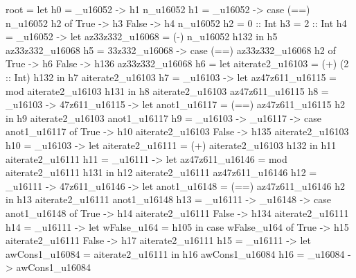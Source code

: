 root = let
         h0 = \n_u16052 -> h1 n_u16052
         h1 = \n_u16052 -> case (==) n_u16052 h2 of
                             True -> h3
                             False -> h4 n_u16052
         h2 = 0 :: Int
         h3 = 2 :: Int
         h4 = \n_u16052 -> let az33z332_u16068 = (-) n_u16052 h132
                           in h5 az33z332_u16068
         h5 = \az33z332_u16068 -> case (==) az33z332_u16068 h2 of
                                    True -> h6
                                    False -> h136 az33z332_u16068
         h6 = let aiterate2_u16103 = (+) (2 :: Int) h132
              in h7 aiterate2_u16103
         h7 = _u16103 -> let
                                     az47z611_u16115 = mod aiterate2_u16103 h131
                                   in h8 aiterate2_u16103 az47z611_u16115
         h8 = _u16103 -> \az47z611_u16115 -> let
                                                         anot1_u16117 = (==) az47z611_u16115 h2
                                                       in h9 aiterate2_u16103 anot1_u16117
         h9 = _u16103 -> _u16117 -> case anot1_u16117 of
                                                      True -> h10 aiterate2_u16103
                                                      False -> h135 aiterate2_u16103
         h10 = _u16103 -> let
                                      aiterate2_u16111 = (+) aiterate2_u16103 h132
                                    in h11 aiterate2_u16111
         h11 = _u16111 -> let
                                      az47z611_u16146 = mod aiterate2_u16111 h131
                                    in h12 aiterate2_u16111 az47z611_u16146
         h12 = _u16111 -> \az47z611_u16146 -> let
                                                          anot1_u16148 = (==) az47z611_u16146 h2
                                                        in h13 aiterate2_u16111 anot1_u16148
         h13 = _u16111 -> _u16148 -> case anot1_u16148 of
                                                       True -> h14 aiterate2_u16111
                                                       False -> h134 aiterate2_u16111
         h14 = _u16111 -> let wFalse_u164 = h105
                                    in case wFalse_u164 of
                                         True -> h15 aiterate2_u16111
                                         False -> h17 aiterate2_u16111
         h15 = _u16111 -> let awCons1_u16084 = aiterate2_u16111
                                    in h16 awCons1_u16084
         h16 = _u16084 -> awCons1_u16084
